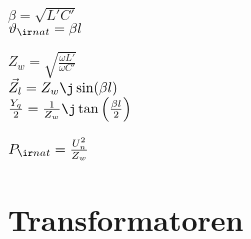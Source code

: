 \documentclass[fs, footer]{latex4ei}
\begin{document}
\begin{multicols*}{4}
{ $\beta = \sqrt{ L' C' }$ \\ 
$\vartheta_{\ir nat} = \beta l $

$Z_w = \sqrt{\frac{\omega L'}{\omega C'}}$ \\ 

$\vec Z_l = Z_w \j \sin ( \beta l)$ \\

$\frac{Y_q}{2} = \frac{1}{Z_w} \j \tan \left( \frac{\beta l}{2} \right)$

$P_{\ir nat} = \frac{U_n^2}{Z_w}$

}
\section{Transformatoren}
\end{multicols*}
\end{document}
